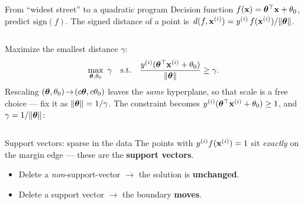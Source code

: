 \documentclass[aspectratio=169]{beamer}
\begin{document}
\begin{frame}{From ``widest street'' to a quadratic program}
  Decision function $f(\mathbf{x}) = \bm{\theta}^\top \mathbf{x} + \theta_0$, predict $\text{sign}(f)$. The signed
  distance of a point is $\,d(f,\mathbf{x}^{(i)}) = y^{(i)}\, f(\mathbf{x}^{(i)}) / \|\bm{\theta}\|$.
  \vskip 2pt
  \begin{columns}[T]
    \small Maximize the smallest distance $\gamma$:
    \begin{align*}
      \max_{\bm{\theta},\theta_0}\ \gamma \quad \text{s.t.}\quad
      \frac{y^{(i)}(\bm{\theta}^\top\mathbf{x}^{(i)}+\theta_0)}{\|\bm{\theta}\|} \ge \gamma.
    \end{align*}
    Rescaling $(\bm{\theta},\theta_0)\!\to\!(c\bm{\theta},c\theta_0)$ leaves the \emph{same} hyperplane, so
    that scale is a free choice --- fix it as $\|\bm{\theta}\| = 1/\gamma$. The
    constraint becomes $y^{(i)}(\bm{\theta}^\top\mathbf{x}^{(i)}+\theta_0)\ge 1$, and $\gamma = 1/\|\bm{\theta}\|$:
  \end{columns}
  \vfill
\end{frame}

\begin{frame}{Support vectors: sparse in the data}
  The points with $y^{(i)} f(\mathbf{x}^{(i)}) = 1$ sit \emph{exactly} on the margin edge --- these are the
  \textbf{support vectors}.
  \begin{itemize}\small
    \item Delete a \emph{non}-support-vector $\to$ the solution is \textbf{unchanged}.
    \item Delete a support vector $\to$ the boundary \textbf{moves}.
  \end{itemize}
  \vfill
\end{frame}
\end{document}

